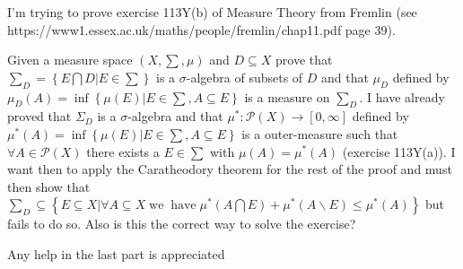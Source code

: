 \documentclass{article}
\newcommand{\tmop}[1]{\ensuremath{\operatorname{#1}}}
\begin{document}
I'm trying to prove exercise 113Y(b) of Measure Theory from Fremlin (see
https://www1.essex.ac.uk/maths/people/fremlin/chap11.pdf page 39).

Given a measure space $\left( X, \sum, \mu \right)$ and $D \subseteq X$ prove
that $\sum_D = \left\{ E \bigcap D|E \in \sum \right\}$ is a $\sigma$-algebra
of subsets of $D$ and that $\mu_D$ defined by $\mu_D (A) = \inf \left\{ \mu
(E) |E \in \sum, A \subseteq E \right\}$ is a measure on $\sum_D$. I have
already proved that $\Sigma_D$ is a $\sigma$-algebra and that $\mu^{\ast} :
\mathcal{P} (X) \rightarrow [0, \infty]$ defined by $\mu^{\ast} (A) = \inf
\left\{ \mu (E) |E \in \sum, A \subseteq E \right\}$ is a outer-measure such
that $\forall A \in \mathcal{P} (X)$ there exists a $E \in \sum$ with $\mu (A)
= \mu^{\ast} (A)$ (exercise 113Y(a)). I want then to apply the Caratheodory
theorem for the rest of the proof and must then show that $\sum_D \subseteq
\left\{ E \subseteq X| \forall A \subseteq X \tmop{we} \tmop{have} \mu^{\ast}
\left( A \bigcap E \right) + \mu^{\ast} (A\backslash E) \leqslant \mu^{\ast}
(A) \right\}$ but fails to do so. Also is this the correct way to solve the
exercise?

Any help in the last part is appreciated

\

\
\end{document}
